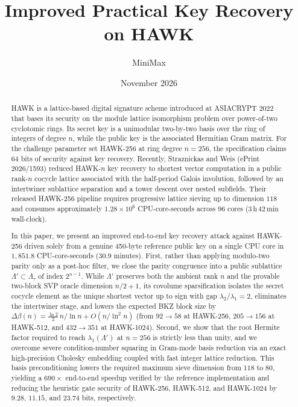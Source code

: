 \documentclass[11pt,a4paper]{article}
\title{\bfseries Improved Practical Key Recovery on HAWK}
\author{MiniMax}
\date{November 2026}
\theoremstyle{definition}
\newcommand{\Lt}{\Lambda_\tau}
\newcommand{\Lp}{\Lambda'}
\begin{document}
\maketitle

\begin{abstract}
HAWK is a lattice-based digital signature scheme introduced at ASIACRYPT 2022 that bases its security on the module lattice isomorphism problem over power-of-two cyclotomic rings. Its secret key is a unimodular two-by-two basis over the ring of integers of degree $n$, while the public key is the associated Hermitian Gram matrix. For the challenge parameter set HAWK-256 at ring degree $n=256$, the specification claims $64$ bits of security against key recovery. Recently, Straznickas and Weis (ePrint 2026/1593) reduced HAWK-$n$ key recovery to shortest vector computation in a public rank-$n$ cocycle lattice associated with the half-period Galois involution, followed by an intertwiner sublattice separation and a tower descent over nested subfields. Their released HAWK-256 pipeline requires progressive lattice sieving up to dimension $118$ and consumes approximately $1.28\times 10^6$ CPU-core-seconds across $96$ cores ($3$\,h\,$42$\,min wall-clock).

In this paper, we present an improved end-to-end key recovery attack against HAWK-256 driven solely from a genuine 450-byte reference public key on a single CPU core in $1{,}851.8$ CPU-core-seconds ($30.9$ minutes). First, rather than applying modulo-two parity only as a post-hoc filter, we close the parity congruence into a public sublattice $\Lp \subset \Lt$ of index $2^{n-1}$. While $\Lp$ preserves both the ambient rank $n$ and the provable two-block SVP oracle dimension $n/2+1$, its covolume sparsification isolates the secret cocycle element as the unique shortest vector up to sign with gap $\lambda_2/\lambda_1 = 2$, eliminates the intertwiner stage, and lowers the expected BKZ block size by $\Delta\beta(n) = \frac{\ln 2}{2}\,n/\ln n + O(n/\ln^2 n)$ (from $92\to 58$ at HAWK-256, $205\to 156$ at HAWK-512, and $432\to 351$ at HAWK-1024). Second, we show that the root Hermite factor required to reach $\lambda_1(\Lp)$ at $n=256$ is strictly less than unity, and we overcome severe condition-number squaring in Gram-mode basis reduction via an exact high-precision Cholesky embedding coupled with fast integer lattice reduction. This basis preconditioning lowers the required maximum sieve dimension from $118$ to $80$, yielding a $690\times$ end-to-end speedup verified by the reference implementation and reducing the heuristic gate security of HAWK-256, HAWK-512, and HAWK-1024 by $9.28$, $11.15$, and $23.74$ bits, respectively.
\end{abstract}
\end{document}
